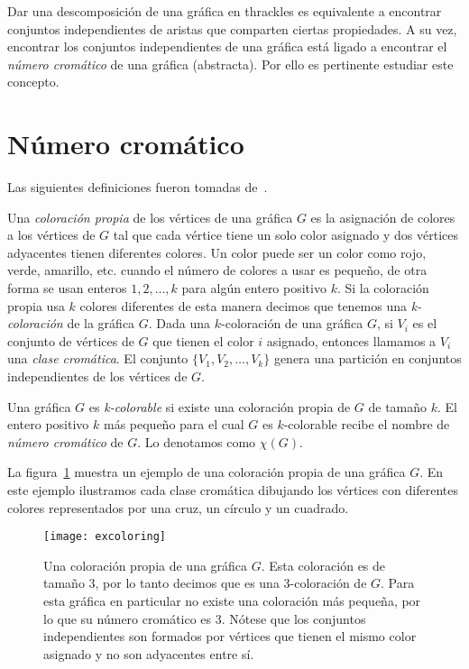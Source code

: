Dar una descomposición de una gráfica en thrackles es equivalente a encontrar
conjuntos independientes de aristas que comparten ciertas propiedades. A su vez,
encontrar los conjuntos independientes de una gráfica está ligado a encontrar el \emph{número cromático}
de una gráfica (abstracta). Por ello es pertinente estudiar este concepto.

\section{Número cromático}
Las siguientes definiciones fueron tomadas de~\cite{Chartrand2008}.

Una \emph{coloración propia} de los vértices de una gráfica $G$ es la asignación
de colores a los vértices de $G$ tal que cada vértice tiene un solo color
asignado y dos vértices adyacentes tienen diferentes colores.
Un color puede ser un color como rojo, verde, amarillo, etc. cuando el número
de colores a usar es pequeño, de otra forma se usan enteros $1,2,\dots,k$
para algún entero positivo $k$. Si la coloración propia usa $k$ colores
diferentes de esta manera decimos que tenemos una \emph{k-coloración} de la gráfica $G$.
Dada una $k$-coloración de una gráfica $G$, si $V_i$ es el conjunto de vértices
de $G$ que tienen el color $i$ asignado, entonces llamamos a $V_i$
una \emph{clase cromática}. El conjunto $\{V_1,V_2,\dots,V_k\}$ genera una partición
en conjuntos independientes de los vértices de $G$.

Una gráfica $G$ es \emph{k-colorable} si existe una coloración propia de $G$ de tamaño $k$.
El entero positivo $k$ más pequeño para el cual $G$ es $k$-colorable recibe el nombre
de \emph{número cromático} de $G$. Lo denotamos como $\chi(G)$.

La figura~\ref{fig:excoloring} muestra un ejemplo de una coloración propia de una gráfica $G$.
En este ejemplo ilustramos cada clase cromática dibujando los vértices con diferentes colores
representados por una cruz, un círculo y un cuadrado.
\begin{figure}[htpb]
  \centering
  \texttt{[image: excoloring]}
  \caption{Una coloración propia de una gráfica $G$. Esta coloración es de tamaño 3, por
  lo tanto decimos que es una 3-coloración de $G$. Para esta gráfica en particular
  no existe una coloración más pequeña, por lo que su número cromático es 3. Nótese
  que los conjuntos independientes son formados por vértices que tienen el mismo
  color asignado y no son adyacentes entre sí.}
  \label{fig:excoloring}
\end{figure}

